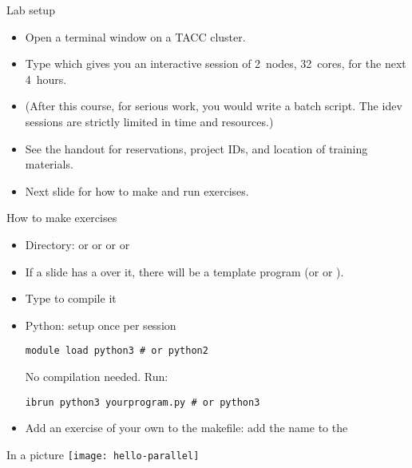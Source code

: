 \begin{tacc}
  \begin{frame}[containsverbatim]{Lab setup}
    \begin{itemize}
    \item Open a terminal window on a TACC cluster.
    \item Type  which gives
      you an interactive session of 2~nodes, 32~cores, for the next
      4~hours.
    \item (After this course, for serious work, you would write a
      batch script. The idev sessions are strictly limited in time and
      resources.)
    \item See the handout for reservations, project IDs, and location of training materials.
    \item Next slide for how to make and run exercises.
    \end{itemize}
  \end{frame}
\end{tacc}

\begin{frame}[containsverbatim]{How to make exercises}
  \begin{itemize}
  \item Directory:  or  or  or 
    or 
  \item If a slide has a  over it, there will be a
    template program  (or  or ).
  \item Type  to compile it
  \item Python: setup once per session
\begin{verbatim}
module load python3 # or python2
\end{verbatim}
No compilation needed. Run:
\begin{verbatim}
ibrun python3 yourprogram.py # or python3
\end{verbatim}
\item Add an exercise of your own to the makefile: add the name to
    the 
  \end{itemize}
\end{frame}

\begin{exerciseframe}[hello]
  
\end{exerciseframe}

\begin{frame}{In a picture}
  \texttt{[image: hello-parallel]}
\end{frame}

